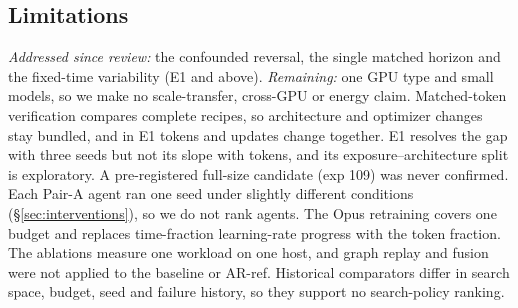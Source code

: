 \documentclass{article}
\newif\ifshowhumanmarkers \showhumanmarkersfalse
\newcommand{\humantag}[1]{{\color{humanframe}\sffamily\scriptsize\bfseries HUMAN AUTHOR MUST REWRITE/VERIFY [#1]}\ }
\newcommand{\humanauthor}[2][]{\ifshowhumanmarkers\begin{humanbox}\humantag{#1}#2\end{humanbox}\else #2\par\fi}
\begin{document}
\subsection{Limitations}
\humanauthor[P2-14 r6]{\emph{Addressed since review:} the confounded reversal, the single matched horizon and the fixed-time variability (E1 and above). \emph{Remaining:} one GPU type and small models, so we make no scale-transfer, cross-GPU or energy claim. Matched-token verification compares complete recipes, so architecture and optimizer changes stay bundled, and in E1 tokens and updates change together. E1 resolves the gap with three seeds but not its slope with tokens, and its exposure--architecture split is exploratory. A pre-registered full-size candidate (exp 109) was never confirmed. Each Pair-A agent ran one seed under slightly different conditions (\S\ref{sec:interventions}), so we do not rank agents. The Opus retraining covers one budget and replaces time-fraction learning-rate progress with the token fraction. The ablations measure one workload on one host, and graph replay and fusion were not applied to the baseline or AR-ref. Historical comparators differ in search space, budget, seed and failure history, so they support no search-policy ranking.}
\end{document}
